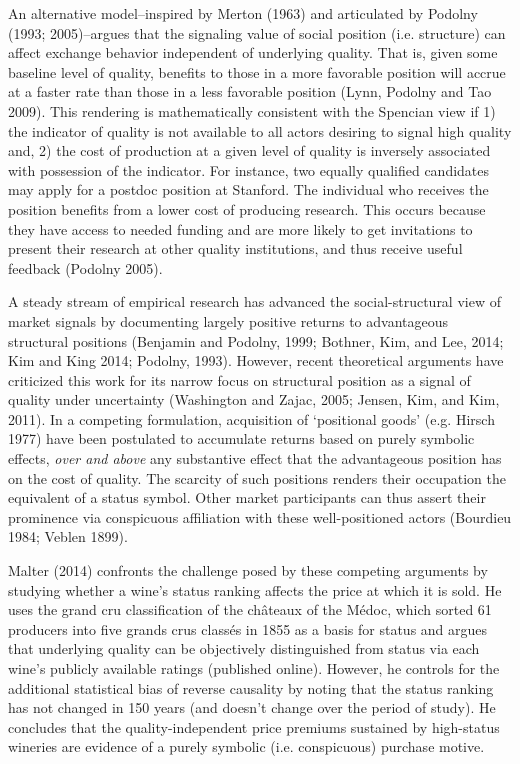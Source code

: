 An alternative model--inspired by Merton (1963) and articulated by Podolny (1993; 2005)--argues that the signaling value of social position (i.e. structure) can affect exchange behavior independent of underlying quality. That is, given some baseline level of quality, benefits to those in a more favorable position will accrue at a faster rate than those in a less favorable position (Lynn, Podolny and Tao 2009). This rendering is mathematically consistent with the Spencian view if 1) the indicator of quality is not available to all actors desiring to signal high quality and, 2) the cost of production at a given level of quality is inversely associated with possession of the indicator. For instance, two equally qualified candidates may apply for a postdoc position at Stanford. The individual who receives the position benefits from a lower cost of producing research. This occurs because they have access to needed funding and are more likely to get invitations to present their research at other quality institutions, and thus receive useful feedback (Podolny 2005).

A steady stream of empirical research has advanced the social-structural view of market signals by documenting largely positive returns to advantageous structural positions (Benjamin and Podolny, 1999; Bothner, Kim, and Lee, 2014; Kim and King 2014; Podolny, 1993). However, recent theoretical arguments have criticized this work for its narrow focus on structural position as a signal of quality under uncertainty (Washington and Zajac, 2005; Jensen, Kim, and Kim, 2011). In a competing formulation, acquisition of `positional goods' (e.g. Hirsch 1977) have been postulated to accumulate returns based on purely symbolic effects, {\it over and above} any substantive effect that the advantageous position has on the cost of quality. The scarcity of such positions renders their occupation the equivalent of a status symbol. Other market participants can thus assert their prominence via conspicuous affiliation with these well-positioned actors (Bourdieu 1984; Veblen 1899). 

Malter (2014) confronts the challenge posed by these competing arguments by studying whether a wine's status ranking affects the price at which it is sold. He uses the grand cru classification of the ch\^ateaux of the M\'edoc, which sorted 61 producers into five grands crus class\'es in 1855 as a basis for status and argues that underlying quality can be objectively distinguished from status via each wine's publicly available ratings (published online). However, he controls for the additional statistical bias of reverse causality by noting that the status ranking has not changed in 150 years (and doesn't change over the period of study). He concludes that the quality-independent price premiums sustained by high-status wineries are evidence of a purely symbolic (i.e. conspicuous) purchase motive.

